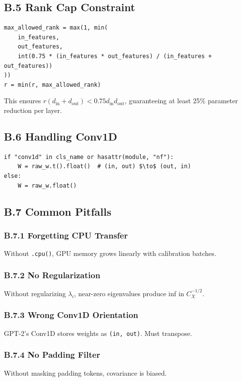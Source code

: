 \subsection{B.5 Rank Cap Constraint}

\begin{lstlisting}
max_allowed_rank = max(1, min(
    in_features,
    out_features,
    int(0.75 * (in_features * out_features) / (in_features + out_features))
))
r = min(r, max_allowed_rank)
\end{lstlisting}

This ensures $r(d_\text{in} + d_\text{out}) < 0.75 d_\text{in} d_\text{out}$, 
guaranteeing at least 25\% parameter reduction per layer.

\subsection{B.6 Handling Conv1D}

\begin{lstlisting}
if "conv1d" in cls_name or hasattr(module, "nf"):
    W = raw_w.t().float()  # (in, out) $\to$ (out, in)
else:
    W = raw_w.float()
\end{lstlisting}

\subsection{B.7 Common Pitfalls}

\subsubsection{B.7.1 Forgetting CPU Transfer}

Without \texttt{.cpu()}, GPU memory grows linearly with calibration batches.

\subsubsection{B.7.2 No Regularization}

Without regularizing $\lambda_i$, near-zero eigenvalues produce inf in 
$C_X^{-1/2}$.

\subsubsection{B.7.3 Wrong Conv1D Orientation}

GPT-2's Conv1D stores weights as \texttt{(in, out)}. Must transpose.

\subsubsection{B.7.4 No Padding Filter}

Without masking padding tokens, covariance is biased.